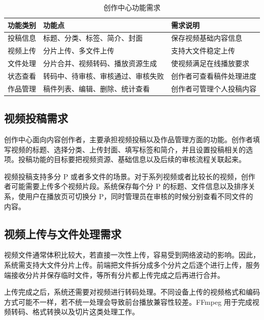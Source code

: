 \begin{table}[htbp]
  \centering
  \caption{创作中心功能需求}
  \label{tab:creator-functions}
  \begin{tabular}{p{}p{}p{}}
    \hline
    \textbf{功能类别} & \textbf{功能点} & \textbf{需求说明} \\
    \hline
    投稿信息 & 标题、分类、标签、简介、封面 & 保存视频基础内容信息 \\
    视频上传 & 分片上传、多文件上传 & 支持大文件稳定上传 \\
    文件处理 & 分片合并、视频转码、播放资源生成 & 使视频满足在线播放要求 \\
    状态查看 & 转码中、待审核、审核通过、审核失败 & 创作者可查看稿件处理进度 \\
    作品管理 & 稿件列表、编辑、删除、统计查看 & 创作者可管理个人投稿内容 \\
    \hline
  \end{tabular}
\end{table}

\subsection{视频投稿需求}
\label{subsec:video-submit-requirements}

创作中心面向内容创作者，主要承担视频投稿以及作品管理方面的功能。创作者填写视频的标题、选择分类、上传封面、填写标签和简介，并且设置投稿相关的选项。投稿功能的目标要把视频资源、基础信息以及后续的审核流程关联起来。

视频投稿支持多分 P 或者多文件的场景。对于系列视频或者比较长的视频，创作者可能需要上传多个视频片段。系统保存每个分 P 的标题、文件信息以及排序关系，使用户在播放页可切换分 P，同时管理员在审核的时候分别查看不同文件的内容。

\subsection{视频上传与文件处理需求}
\label{subsec:upload-file-processing-requirements}

视频文件通常体积比较大，若直接一次性上传，容易受到网络波动的影响。因此，系统需支持大文件分片上传。前端把文件拆分成多个分片之后逐个进行上传，服务端接收分片并保存临时文件，等所有分片都上传完成之后再进行合并。

上传完成之后，系统还需要对视频进行转码处理。不同设备上传的视频格式和编码方式可能不一样，若不统一处理会导致前台播放兼容性较差。FFmpeg 用于完成视频转码、格式转换以及切片这类处理工作\cite{ffmpegdocs}。

